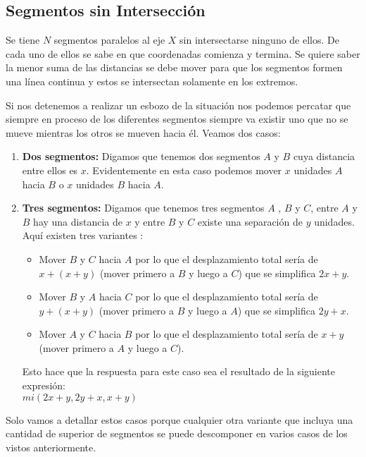 \subsection{Segmentos sin Intersección} Se tiene $N$ segmentos paralelos al eje $X$ sin intersectarse ninguno de ellos. De cada uno de ellos se sabe en que coordenadas comienza y termina. Se quiere saber la menor suma de las distancias se debe mover para que los segmentos formen una línea continua y estos se intersectan solamente en los extremos.

Si nos detenemos a realizar un esbozo de la situación nos podemos percatar que siempre en proceso de los diferentes segmentos siempre va existir uno que no se mueve mientras los otros se mueven hacia él. Veamos dos casos:

\begin{enumerate}
	\item \textbf{Dos segmentos:} Digamos que tenemos dos segmentos $A$ y $B$ cuya distancia entre ellos es $x$. Evidentemente en esta caso podemos mover $x$ unidades $A$ hacia $B$ o $x$ unidades $B$ hacia $A$.
	
	\item \textbf{Tres segmentos:} Digamos que tenemos tres segmentos $A$ , $B$ y $C$, entre $A$ y $B$ hay una distancia de $x$ y entre $B$ y $C$ existe una separación de $y$ unidades. Aquí existen tres variantes :
	
	\begin{itemize}
		\item Mover $B$ y $C$ hacia $A$ por lo que el desplazamiento total sería de $x+(x+y)$ (mover primero a $B$ y luego a $C$) que se simplifica $2x+y$.
		
		\item  Mover $B$ y $A$ hacia $C$ por lo que el desplazamiento total sería de $y+(x+y)$ (mover primero a $B$ y luego a $A$) que se simplifica $2y+x$.
		
		\item Mover $A$ y $C$ hacia $B$ por lo que el desplazamiento total sería de $x+y$ (mover primero a $A$ y luego a $C$).
	\end{itemize}
	
	Esto hace que la respuesta para este caso sea el resultado de la siguiente expresión:\\
	$mi(2x+y, 2y+x, x+y)$
\end{enumerate}

Solo vamos a detallar estos casos porque cualquier otra variante que incluya una cantidad de superior de segmentos se puede descomponer en varios casos de los vistos anteriormente.

